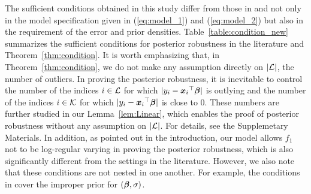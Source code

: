 \documentclass[12pt]{article}
\def\si{{\sigma}}
\def\si{{\sigma}}
\def\Lc{{\cal L}}
\def\Kc{{\cal K}}
\def\si{{\sigma}}
\def\bbe{{\text{\boldmath $\beta$}}}
\def\x{{\text{\boldmath $x$}}}
\def\Lc{{\cal L}}
\def\Kc{{\cal K}}
\begin{document}
The sufficient conditions obtained in this study differ from those in \cite{Gag2019} and \cite{hamura2020log} not only in the model specification given in (\ref{eq:model_1}) and (\ref{eq:model_2}) but also in the requirement of the error and prior densities. 
Table~\ref{table:condition_new} summarizes the sufficient conditions for posterior robustness in the literature and Theorem~\ref{thm:condition}. 
It is worth emphasizing that, in Theorem~\ref{thm:condition}, we do not make any assumption directly on $| \Lc |$, the number of outliers. In proving the posterior robustness, it is inevitable to control the number of the indices $i \in \Lc $ for which $| y_i - {\x _i}^{\top } \bbe |$ is outlying and the number of the indices $i \in \Kc $ for which $| y_i - {\x _i}^{\top } \bbe |$ is close to $0$. 
%
These numbers are further studied in our Lemma~\ref{lem:Linear}, which enables the proof of posterior robustness without any assumption on $|\Lc|$. For details, see the Supplemetary Materials. 
In addition, as pointed out in the introduction, our model allows $f_1$ not to be log-regular varying in proving the posterior robustness, which is also significantly different from the settings in the literature. 
However, we also note that these conditions are not nested in one another. For example, the conditions in \cite{Gag2019} cover the improper prior for $(\bbe,\si)$. 
%
\end{document}
